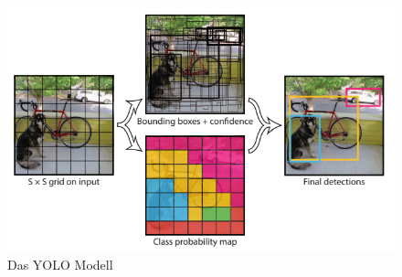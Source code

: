 {{	\begin{figure}[ht]
		\centering
		\includegraphics*[scale = 2, keepaspectratio, trim=2 2 2 2 ]{images/YOLO/YOLO_model.png}
		\caption[Das YOLO Modell]{Das YOLO Modell\citep{Plastiras2018}}
		\label{YOLO_Model}
 	\end{figure}

}}
